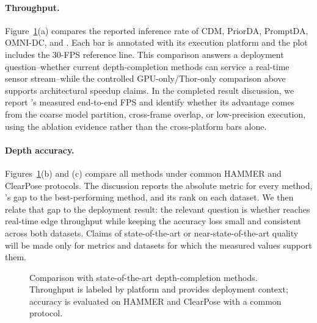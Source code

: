 \paragraph{Throughput.}
Figure~\ref{fig:sota-results}(a) compares the reported inference rate of CDM,
PriorDA, PromptDA, OMNI-DC, and \system{}.  Each bar is annotated with its
execution platform and the plot includes the 30-FPS reference line.  This
comparison answers a deployment question--whether current depth-completion
methods can service a real-time sensor stream--while the controlled
GPU-only/Thor-only comparison above supports architectural speedup claims.  In
the completed result discussion, we report \system{}'s measured end-to-end FPS
and identify whether its advantage comes from the coarse model partition,
cross-frame overlap, or low-precision execution, using the ablation evidence
rather than the cross-platform bars alone.

\paragraph{Depth accuracy.}
Figures~\ref{fig:sota-results}(b) and (c) compare all methods under common
HAMMER and ClearPose protocols.  The discussion reports the absolute metric
for every method, \system{}'s gap to the best-performing method, and its rank on
each dataset.  We then relate that gap to the deployment result: the relevant
question is whether \system{} reaches real-time edge throughput while keeping
the accuracy loss small and consistent across both datasets.  Claims of
state-of-the-art or near-state-of-the-art quality will be made only for metrics
and datasets for which the measured values support them.

\begin{figure}[t]
  \centering
  \caption{Comparison with state-of-the-art depth-completion methods.
  Throughput is labeled by platform and provides deployment context; accuracy
  is evaluated on HAMMER and ClearPose with a common protocol.}
  \label{fig:sota-results}
\end{figure}

